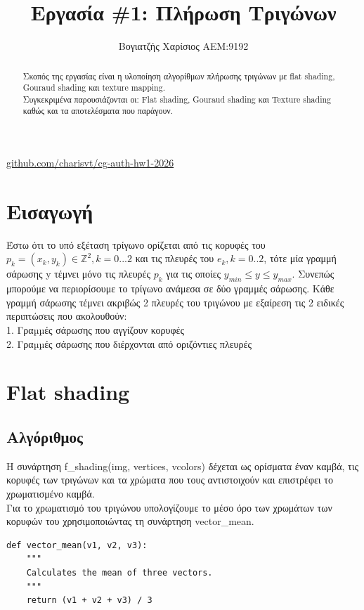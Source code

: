 \documentclass{article}
\title{Εργασία \#1: Πλήρωση Τριγώνων}
\author{Βογιατζής Χαρίσιος ΑΕΜ:9192}
\begin{document}
\maketitle

\begin{center}
\href{https://github.com/charisvt/cg-auth-hw1-2026}{github.com/charisvt/cg-auth-hw1-2026}
\end{center}

\begin{abstract}
Σκοπός της εργασίας είναι η υλοποίηση αλγορίθμων πλήρωσης τριγώνων με flat shading, Gouraud shading και texture mapping.\\
Συγκεκριμένα παρουσιάζονται οι: Flat shading, Gouraud shading και Texture shading καθώς και τα αποτελέσματα που παράγουν.
\end{abstract}

\section{Εισαγωγή}
Έστω ότι το υπό εξέταση τρίγωνο ορίζεται από τις κορυφές του $p_k = (x_k, y_k) \in \mathbb{Z}^2 , k = 0...2$ και τις πλευρές του $e_k, k = 0..2$, τότε μία γραμμή σάρωσης y τέμνει μόνο τις πλευρές $p_k$ για τις οποίες $y_{min} \leq y \leq y_{max}$. Συνεπώς μπορούμε να περιορίσουμε το τρίγωνο ανάμεσα σε δύο γραμμές σάρωσης. Κάθε γραμμή σάρωσης τέμνει ακριβώς 2 πλευρές του τριγώνου με εξαίρεση τις 2 ειδικές περιπτώσεις που ακολουθούν: \\
1. Γραµµές σάρωσης που αγγίζουν κορυφές\\
2. Γραµµές σάρωσης που διέρχονται από οριζόντιες πλευρές\\

\section{Flat shading}

\subsection{Αλγόριθμος}
Η συνάρτηση f\_shading(img, vertices, vcolors) δέχεται ως ορίσματα έναν καμβά, τις κορυφές των τριγώνων και τα χρώματα που τους αντιστοιχούν και επιστρέφει το χρωματισμένο καμβά.\\
Για το χρωματισμό του τριγώνου υπολογίζουμε το μέσο όρο των χρωμάτων των κορυφών του χρησιμοποιώντας τη συνάρτηση vector\_mean.

\begin{lstlisting}
def vector_mean(v1, v2, v3):
    """
    Calculates the mean of three vectors.
    """
    return (v1 + v2 + v3) / 3
\end{lstlisting}
\end{document}

